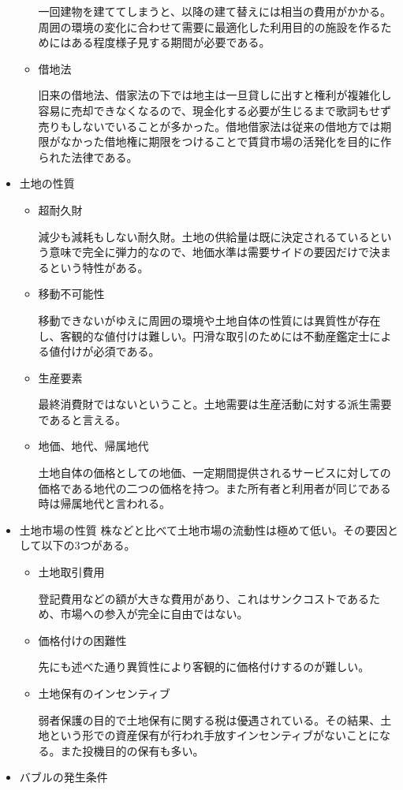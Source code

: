 \documentclass{jsarticle}
\begin{document}
\begin{itemize}
\begin{itemize}
	一回建物を建ててしまうと、以降の建て替えには相当の費用がかかる。周囲の環境の変化に合わせて需要に最適化した利用目的の施設を作るためにはある程度様子見する期間が必要である。
	\item 借地法
	
	旧来の借地法、借家法の下では地主は一旦貸しに出すと権利が複雑化し容易に売却できなくなるので、現金化する必要が生じるまで歌詞もせず売りもしないでいることが多かった。借地借家法は従来の借地方では期限がなかった借地権に期限をつけることで賃貸市場の活発化を目的に作られた法律である。
	\end{itemize}
\item 土地の性質
	\begin{itemize}
	\item 超耐久財
	
	減少も減耗もしない耐久財。土地の供給量は既に決定されるているという意味で完全に弾力的なので、地価水準は需要サイドの要因だけで決まるという特性がある。
	\item 移動不可能性
	
	移動できないがゆえに周囲の環境や土地自体の性質には異質性が存在し、客観的な値付けは難しい。円滑な取引のためには不動産鑑定士による値付けが必須である。
	\item 生産要素
	
	最終消費財ではないということ。土地需要は生産活動に対する派生需要であると言える。
	\item 地価、地代、帰属地代
	
	土地自体の価格としての地価、一定期間提供されるサービスに対しての価格である地代の二つの価格を持つ。また所有者と利用者が同じである時は帰属地代と言われる。
	\end{itemize}
\item 土地市場の性質
株などと比べて土地市場の流動性は極めて低い。その要因として以下の3つがある。
	\begin{itemize}
	\item 土地取引費用
	
	登記費用などの額が大きな費用があり、これはサンクコストであるため、市場への参入が完全に自由ではない。
	\item 価格付けの困難性
	
	先にも述べた通り異質性により客観的に価格付けするのが難しい。
	\item 土地保有のインセンティブ
	
	弱者保護の目的で土地保有に関する税は優遇されている。その結果、土地という形での資産保有が行われ手放すインセンティブがないことになる。また投機目的の保有も多い。
	\end{itemize}
\item バブルの発生条件


\end{itemize}
\end{document}
